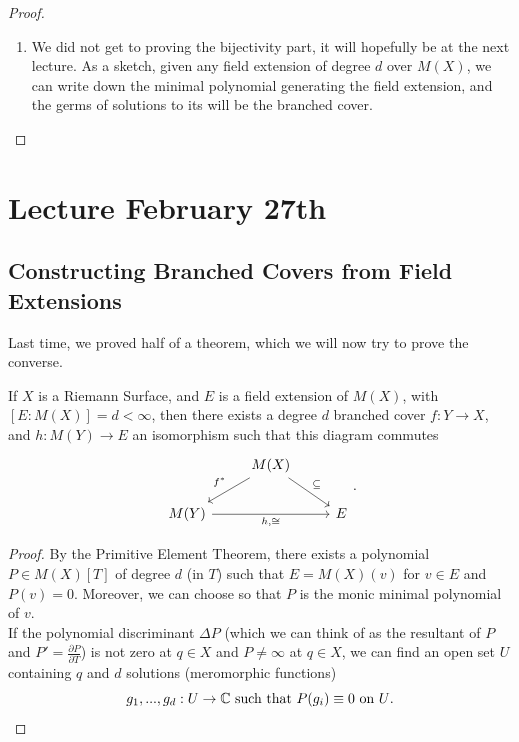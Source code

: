 \documentclass{article}
\begin{document}
{\begin{proof}
\begin{enumerate}
        Thus, the minimal polynomial $P(X)$ has degree at least $d$. By $(\dagger)$, it means that its degree is exactly $d$. Hence, we conclude that
        \[[M(Y): M(X)] = d.\]
        \item We did not get to proving the bijectivity part, it will hopefully be at the next lecture. As a sketch, given any field extension of degree $d$ over $M(X)$, we can write down the minimal polynomial generating the field extension, and the germs of solutions to its will be the branched cover.
\end{enumerate}
\end{proof}

\newpage
\section{Lecture February 27th}

\subsection{Constructing Branched Covers from Field Extensions}

Last time, we proved half of a theorem, which we will now try to prove the converse.
\begin{theorem}
    If $X$ is a Riemann Surface, and $E$ is a field extension of $M(X)$, with $[E: M(X)] = d < \infty$, then there exists a degree $d$ branched cover $f: Y \to X$, and $h: M(Y) \to E$ an isomorphism such that this diagram commutes
\[\begin{tikzcd}
	& {M(X)} \\
	{M(Y)} && E
	\arrow["\subseteq", from=1-2, to=2-3]
	\arrow["{f^*}"', from=1-2, to=2-1]
	\arrow["{h, \cong}"', from=2-1, to=2-3]
\end{tikzcd}.\]
\end{theorem}

\begin{proof}
    By the Primitive Element Theorem, there exists a polynomial $P \in M(X)[T]$ of degree $d$ (in $T$) such that $E = M(X)(v)$ for $v \in E$ and $P(v) = 0$. Moreover, we can choose so that $P$ is the monic minimal polynomial of $v$.\\

    If the polynomial discriminant $\Delta P$ (which we can think of as the resultant of $P$ and $P' = \frac{\partial P}{\partial T}$) is not zero at $ q\in X$ and $P \neq \infty$ at $q \in X$, we can find an open set $U$ containing $q$ and $d$ solutions (meromorphic functions)
    \[g_1, ..., g_d: U \to \mathbb{C} \text{ such that } P(g_i) \equiv 0 \text{ on $U$}.\]


\end{proof}}
\end{document}
